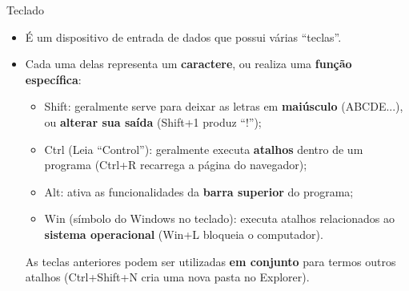 \begin{frame}{Teclado}
	\begin{block}{}
		\begin{itemize}
			\item É um dispositivo de entrada de dados que possui várias ``teclas''.
			\item Cada uma delas representa um \textbf{caractere}, ou realiza uma \textbf{função específica}:
			      \begin{itemize}
				      \item\normalsize Shift: geralmente serve para deixar as letras em \textbf{maiúsculo} (ABCDE...), ou \textbf{alterar sua saída} (Shift+1 produz ``!'');

				            \smallskip

				      \item\normalsize Ctrl (Leia ``Control''): geralmente executa \textbf{atalhos} dentro de um programa (Ctrl+R recarrega a página do navegador);

				            \smallskip

				      \item\normalsize Alt: ativa as funcionalidades da \textbf{barra superior} do programa;

				            \smallskip

				      \item\normalsize Win (símbolo do Windows no teclado): executa atalhos relacionados ao \textbf{sistema operacional} (Win+L bloqueia o computador).
			      \end{itemize}
			      As teclas anteriores podem ser utilizadas \textbf{em conjunto} para termos outros atalhos (Ctrl+Shift+N cria uma nova pasta no Explorer).
		\end{itemize}
	\end{block}
\end{frame}


